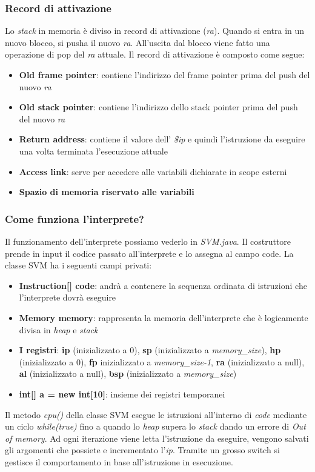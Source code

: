 \documentclass[../../main]{subfiles}
\begin{document}
\subsubsection{Record di attivazione}
Lo \emph{stack} in memoria è diviso in record di attivazione (\emph{ra}). Quando si entra in un nuovo blocco, si pusha il nuovo \emph{ra}. All'uscita dal blocco viene fatto una operazione di pop del \emph{ra} attuale.
Il record di attivazione è composto come segue: 
\begin{itemize}
    \item \textbf{Old frame pointer}: contiene l'indirizzo del frame pointer prima del push del nuovo \emph{ra}
    \item \textbf{Old stack pointer}: contiene l'indirizzo dello stack pointer prima del push del nuovo \emph{ra}
    \item \textbf{Return address}: contiene il valore dell' \emph{\$ip} e quindi l'istruzione da eseguire una volta terminata l'esecuzione attuale
    \item \textbf{Access link}: serve per accedere alle variabili dichiarate in scope esterni
    \item \textbf{Spazio di memoria riservato alle variabili}
\end{itemize}

\subsubsection{Come funziona l'interprete?}
Il funzionamento dell'interprete possiamo vederlo in \emph{SVM.java}. Il costruttore prende in input il codice passato all'interprete e lo assegna al campo code.
La classe SVM ha i seguenti campi privati:
\begin{itemize}
    \item \textbf{Instruction[] code}: andrà a contenere la sequenza ordinata di istruzioni che l'interprete dovrà eseguire
    \item \textbf{Memory memory}: rappresenta la memoria dell'interprete che è logicamente divisa in \emph{heap} e \emph{stack}
    \item \textbf{I registri}: \textbf{ip} (inizializzato a 0), \textbf{sp} (inizializzato a \emph{memory_size}), \textbf{hp} (inizializzato a 0), \textbf{fp} inizializzato a \emph{memory_size-1}, \textbf{ra} (inizializzato a null), \textbf{al} (inizializzato a null), \textbf{bsp} (inizializzato a \emph{memory_size}) 
    \item \textbf{int[] a = new int[10]}: insieme dei registri temporanei
\end{itemize}
Il metodo \emph{cpu()} della classe SVM esegue le istruzioni all'interno di \emph{code} mediante un ciclo \emph{while(true)} fino a quando lo \emph{heap} supera lo \emph{stack} dando un errore di \emph{Out of memory}.
Ad ogni iterazione viene letta l'istruzione da eseguire, vengono salvati gli argomenti che possiete e incrementato l'\emph{ip}. Tramite un grosso switch si gestisce il comportamento in base all'istruzione in esecuzione. 
\end{document}
